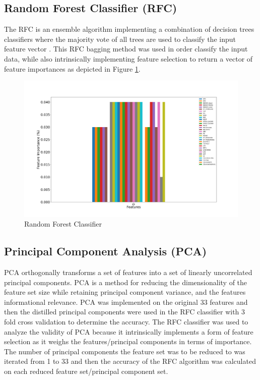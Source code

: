 \documentclass{article}\raggedbottom
\begin{document}
\subsection{\color{red}Random Forest Classifier (RFC)}
The RFC is an ensemble algorithm implementing a combination of decision trees classifiers where the majority vote of all trees are used to classify the input feature vector \cite{pal2005random}. This RFC bagging method was used in order classify the input data, while also intrinsically implementing feature selection to return a vector of feature importances as depicted in Figure \ref{fig:RFC}. 

\begin{figure}[h!]
	\centering
	\includegraphics[width=\linewidth]{data/RFC_importancesT1.png}
	\caption{Random Forest Classifier}
	\label{fig:RFC}
\end{figure}

\subsection{Principal Component Analysis (PCA)}
PCA orthogonally transforms a set of features into a set of linearly uncorrelated principal components. PCA is a method for reducing the dimensionality of the feature set size while retaining principal component variance, and the features informational relevance. PCA was implemented on the original 33 features and then the distilled principal components were used in the RFC classifier with 3 fold cross validation to determine the accuracy. The RFC classifier was used to analyze the validity of PCA because it intrinsically implements a form of feature selection as it weighs the features/principal components in terms of importance. The number of principal components the feature set was to be reduced to was iterated from 1 to 33 and then the accuracy of the RFC algorithm was calculated on each reduced feature set/principal component set.
\end{document}
